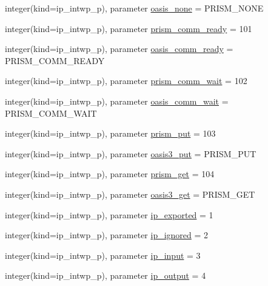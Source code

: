 \begin{DoxyCompactItemize}
\item 
integer(kind=ip\+\_\+intwp\+\_\+p), parameter \hyperlink{classmod__oasis__parameters_a368402af56fd08ed95ad88d0c987733a}{oasis\+\_\+none} = P\+R\+I\+S\+M\+\_\+\+N\+O\+N\+E
\item 
integer(kind=ip\+\_\+intwp\+\_\+p), parameter \hyperlink{classmod__oasis__parameters_a953f0a4738f9ca919cf5e446998cc79e}{prism\+\_\+comm\+\_\+ready} = 101
\item 
integer(kind=ip\+\_\+intwp\+\_\+p), parameter \hyperlink{classmod__oasis__parameters_a8484e196ef7469adbeaef850787d7502}{oasis\+\_\+comm\+\_\+ready} = P\+R\+I\+S\+M\+\_\+\+C\+O\+M\+M\+\_\+\+R\+E\+A\+D\+Y
\item 
integer(kind=ip\+\_\+intwp\+\_\+p), parameter \hyperlink{classmod__oasis__parameters_a3d0349d8815bf1848122d99993097842}{prism\+\_\+comm\+\_\+wait} = 102
\item 
integer(kind=ip\+\_\+intwp\+\_\+p), parameter \hyperlink{classmod__oasis__parameters_a9df795bd9123857642aae31661b6c13a}{oasis\+\_\+comm\+\_\+wait} = P\+R\+I\+S\+M\+\_\+\+C\+O\+M\+M\+\_\+\+W\+A\+I\+T
\item 
integer(kind=ip\+\_\+intwp\+\_\+p), parameter \hyperlink{classmod__oasis__parameters_ad8db79b2d411e8f04445dcc2ed619548}{prism\+\_\+put} = 103
\item 
integer(kind=ip\+\_\+intwp\+\_\+p), parameter \hyperlink{classmod__oasis__parameters_a325334a5e2f9d0c7846c1ef964f9f7e3}{oasis3\+\_\+put} = P\+R\+I\+S\+M\+\_\+\+P\+U\+T
\item 
integer(kind=ip\+\_\+intwp\+\_\+p), parameter \hyperlink{classmod__oasis__parameters_a136a476f2771e33d12e42b47eef72f9b}{prism\+\_\+get} = 104
\item 
integer(kind=ip\+\_\+intwp\+\_\+p), parameter \hyperlink{classmod__oasis__parameters_aa2ac99363b8f1aa7ff950fda3e3f5fff}{oasis3\+\_\+get} = P\+R\+I\+S\+M\+\_\+\+G\+E\+T
\item 
integer(kind=ip\+\_\+intwp\+\_\+p), parameter \hyperlink{classmod__oasis__parameters_a0f729cda95773cdc8df800eacdceb606}{ip\+\_\+exported} = 1
\item 
integer(kind=ip\+\_\+intwp\+\_\+p), parameter \hyperlink{classmod__oasis__parameters_ae3733a399c07b165b5ad19543ca1d2a2}{ip\+\_\+ignored} = 2
\item 
integer(kind=ip\+\_\+intwp\+\_\+p), parameter \hyperlink{classmod__oasis__parameters_a6a7bcd0e3a33573729f94098ecd9a922}{ip\+\_\+input} = 3
\item 
integer(kind=ip\+\_\+intwp\+\_\+p), parameter \hyperlink{classmod__oasis__parameters_a556f148d126d8d6dfe711656024436e6}{ip\+\_\+output} = 4

\end{DoxyCompactItemize}
